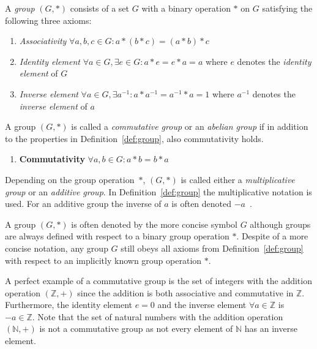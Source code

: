 \begin{defn}[Group]
\label{def:group}
 A \textit{group} $\left( G, * \right)$ consists of a set $G$ with a binary operation $*$ on $G$ satisfying the following three axioms:
 \begin{enumerate}
  \item \textit{Associativity} $\forall a, b, c \in G: a*(b*c) = (a*b)*c$
  \item \textit{Identity element} $\forall a \in G, \exists e \in G: a*e = e*a = a $ where $e$ denotes the \textit{identity element} of $G$
  \item \textit{Inverse element} $\forall a \in G, \exists a^{-1}: a*a^{-1} = a^{-1}*a = 1$ where $a^{-1}$ denotes the \textit{inverse element} of $a$
  \setcounter{enumTemp}{\theenumi}
 \end{enumerate}

\end{defn}

\begin{defn}
 A group $\left( G, * \right)$ is called a \textit{commutative group} or an \textit{abelian group} if in addition to the properties in Definition~\ref{def:group}, also commutativity holds.
 \begin{enumerate}
  \setcounter{enumi}{\theenumTemp}
  \item \textbf{Commutativity} $\forall a, b \in G: a*b = b*a$
 \end{enumerate}

\end{defn}

Depending on the group operation~$*$, $\left( G, * \right)$ is called either a \textit{multiplicative group} or an \textit{additive group}. In Definition~\ref{def:group} the multiplicative notation is used. For an additive group  the inverse of $a$ is often denoted $-a$~\cite{book:handbook_of_applied_cryptography}. 

A group $\left( G, * \right)$ is often denoted by the more concise symbol $G$ although groups are always defined with respect to a binary group operation $*$. Despite of a more concise notation, any group $G$ still obeys all axioms from Definition~\ref{def:group} with respect to an implicitly known group operation $*$.

A perfect example of a commutative group is the set of integers with the addition operation $\left( \mathbb{Z}, + \right)$ since the addition is both associative and commutative in $\mathbb{Z}$. Furthermore, the identity element $e = 0$ and the inverse element $\forall a \in \mathbb{Z}$ is $-a \in \mathbb{Z}$. Note that the set of natural numbers with the addition operation $\left( \mathbb{N}, + \right)$ is not a commutative group as not every element of $\mathbb{N}$ has an inverse element.

